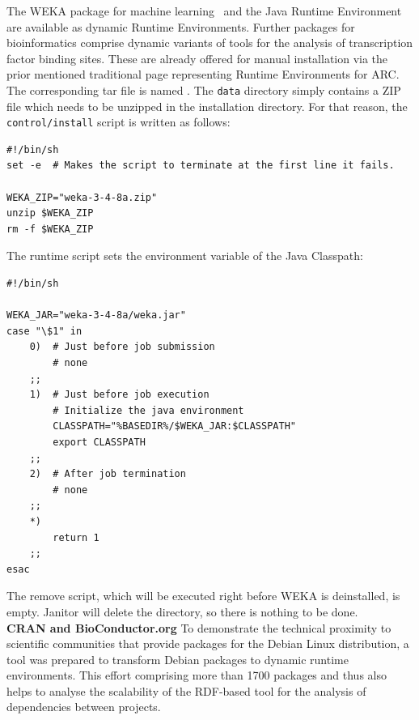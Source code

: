 The WEKA package for machine learning~\cite{FRANK_2004} and the Java Runtime Environment
are available as dynamic Runtime Environments. Further packages for bioinformatics comprise dynamic
variants of tools for the analysis of transcription factor binding sites. These are already offered for manual
installation via the prior mentioned traditional page representing Runtime Environments for ARC. 
The corresponding tar file is named . The \texttt{data} directory simply contains a ZIP file
which needs to be unzipped in the installation directory. For that reason, the \texttt{control/install} script is 
written as follows:
\begin{verbatim} 
#!/bin/sh
set -e  # Makes the script to terminate at the first line it fails.

WEKA_ZIP="weka-3-4-8a.zip"
unzip $WEKA_ZIP
rm -f $WEKA_ZIP
\end{verbatim}
The runtime script sets the environment variable of the Java Classpath:
\begin{verbatim}
#!/bin/sh

WEKA_JAR="weka-3-4-8a/weka.jar"
case "\$1" in
	0)	# Just before job submission
		# none
	;;
	1)	# Just before job execution
		# Initialize the java environment
		CLASSPATH="%BASEDIR%/$WEKA_JAR:$CLASSPATH"
		export CLASSPATH
	;;
	2)	# After job termination
		# none
	;;
	*)
		return 1
	;;
esac	
\end{verbatim}
The remove script, which will be executed right before WEKA is deinstalled, is empty. Janitor will delete the directory, so there
is nothing to be done.\\



\textbf{CRAN and BioConductor.org} To demonstrate the technical proximity to scientific communities that
provide packages for the Debian Linux distribution, a tool was prepared to transform Debian packages to
dynamic runtime environments\cite{MOELLER_2007}. This effort comprising more than 1700 packages and
thus also helps to analyse the scalability of the RDF-based tool for the analysis of dependencies between
projects.  \\


